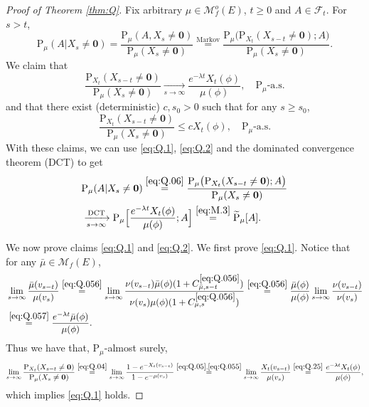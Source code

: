 \documentclass[12pt,a4paper]{amsart}
\numberwithin{equation}{section}
\theoremstyle{plain}
\theoremstyle{definition}
\theoremstyle{remark}
\begin{document}
\begin{proof}[Proof of Theorem \ref{thm:Q}]
	Fix arbitrary $\mu\in \mathcal M^o_f(E)$, $t\ge 0$ and $A\in\mathscr F_t$.
	For $s>t$,
\begin{equation} \label{eq:Q.06}
	\mathrm P_\mu(A|X_s\neq \mathbf 0)
	=\frac{\mathrm P_\mu(A, X_s \neq \mathbf 0)}{\mathrm P_\mu(X_s\neq \mathbf 0)}
	\overset{\text{Markov}}=\frac{\mathrm P_\mu\big(\mathrm P_{X_t}(X_{s-t} \neq \mathbf 0);A\big)}{\mathrm P_\mu(X_s\neq \mathbf 0)}.
\end{equation}
		We claim that
\begin{equation} \label{eq:Q.1}
	\frac{\mathrm P_{X_t}(X_{s-t} \neq \mathbf 0)}{\mathrm P_\mu(X_{s} \neq \mathbf 0)}
	\xrightarrow[s\to \infty]{} \frac{e^{-\lambda t}X_t(\phi)}{\mu(\phi) },
	\quad \mathrm P_\mu\text{-a.s.}
\end{equation}
	and that there exist (deterministic) $c,s_0>0$ such that for any $s\geq s_0$,
\begin{equation} \label{eq:Q.2}
	\frac{\mathrm P_{X_t}(X_{s-t} \neq \mathbf 0)}{\mathrm P_\mu(X_{s} \neq \mathbf 0)}
	\leq cX_t(\phi), \quad \mathrm P_\mu\text{-a.s.}
\end{equation}
With these claims, we can use \eqref{eq:Q.1}, \eqref{eq:Q.2} and the dominated convergence theorem (DCT) to get
\begin{align}
&  \mathrm P_\mu(A|X_s\neq \mathbf 0)
	\overset{\eqref{eq:Q.06}}=  \frac{\mathrm P_\mu\big(\mathrm P_{X_t}(X_{s-t} \neq \mathbf 0);A\big)}{\mathrm P_\mu(X_s\neq \mathbf 0)}
	\\&\xrightarrow[s\to \infty]{\text{DCT}} \mathrm P_\mu\Big[\frac{e^{-\lambda t}X_t(\phi)}{\mu(\phi) }; A\Big]
	\overset{\eqref{eq:M.3}} = \widetilde{\mathrm P}_\mu[A].
\end{align}

    We now prove  claims \eqref{eq:Q.1} and \eqref{eq:Q.2}.
	We first prove \eqref{eq:Q.1}.
	Notice that for any $\bar \mu\in \mathcal M_f(E)$,
\begin{align}
	&\lim_{s\rightarrow\infty}\dfrac{ \bar \mu(v_{s-t}) }{ \mu(v_s) }
	\overset{\eqref{eq:Q.056}}=\lim_{s\to \infty} \frac{\nu(v_{s-t})\bar \mu (\phi) (1+C_{\bar \mu,s-t}^{\eqref{eq:Q.056}})}{\nu(v_s)\mu(\phi)(1+C_{\mu,s}^{\eqref{eq:Q.056}})}
	\overset{\eqref{eq:Q.056}}= \frac{\bar \mu(\phi)}{\mu(\phi)}\lim_{s\to \infty} \frac{\nu(v_{s-t}) }{\nu(v_s)}
	\\\label{eq:Q.25}&\overset{\eqref{eq:Q.057}}= \frac{e^{-\lambda t} \bar \mu(\phi)}{\mu(\phi)}.
\end{align}
	Thus we have that, $\mathrm P_\mu$-almost surely,
\begin{equation}
	\lim_{s\to\infty}\frac{\mathrm P_{X_t}(X_{s-t}\neq \mathbf 0)}{\mathrm P_\mu(X_s\neq \mathbf 0)}
	\overset{\eqref{eq:Q.04}}=\lim_{s\to\infty}\frac{1-e^{- X_t(v_{s-t}) }}{1-e^{- \mu(v_s) }}
	\overset{\eqref{eq:Q.05},\eqref{eq:Q.055}}=\lim_{s\rightarrow\infty}\dfrac{ X_t(v_{s-t}) }{ \mu(v_s) }
	\overset{\eqref{eq:Q.25}}= \frac{e^{-\lambda t} X_t(\phi)}{\mu(\phi)},
\end{equation}
	which implies \eqref{eq:Q.1} holds.


\end{proof}
\end{document}
